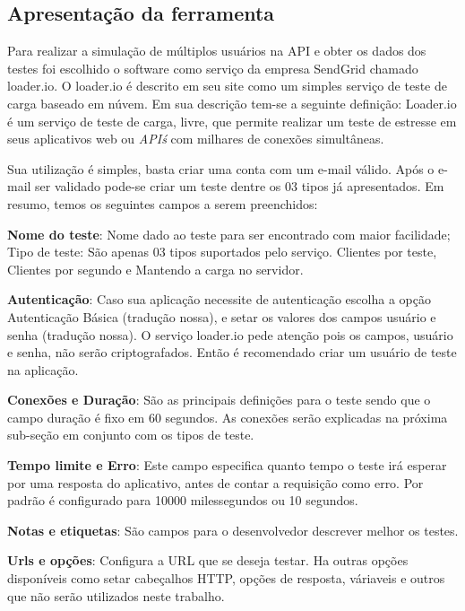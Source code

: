 \subsection{Apresentação da ferramenta}
  
  Para realizar a simulação de múltiplos usuários na \ac{API} e obter os dados dos testes foi 
  escolhido o software como serviço da empresa SendGrid chamado loader.io. O loader.io é descrito em seu site
  como um simples serviço de teste de carga baseado em núvem. Em sua descrição tem-se a seguinte
  definição: Loader.io é um serviço de teste de carga, livre, que permite realizar um teste de estresse em 
  seus aplicativos web ou \textit{API\'s} com milhares de conexões simultâneas.
  
  Sua utilização é simples, basta criar uma conta com um e-mail válido. Após o e-mail ser validado pode-se 
  criar um teste dentre os 03 tipos já apresentados. Em resumo, temos os seguintes campos a serem preenchidos:
  
  \textbf{Nome do teste}: Nome dado ao teste para ser encontrado com maior facilidade;
  Tipo de teste: São apenas 03 tipos suportados pelo serviço. Clientes por teste, Clientes por segundo e Mantendo 
  a carga no servidor.
  
  \textbf{Autenticação}: Caso sua aplicação necessite de autenticação escolha a opção Autenticação Básica (tradução nossa),
  e setar os valores dos campos usuário e senha (tradução nossa). O serviço loader.io pede atenção 
  pois os campos, usuário e senha, não serão criptografados. Então é recomendado criar um usuário de teste na aplicação.
  
  \textbf{Conexões e Duração}: São as principais definições para o teste sendo que o campo duração
  é fixo em 60 segundos. As conexões serão explicadas na próxima sub-seção em conjunto com os tipos de teste.
  
  \textbf{Tempo limite e Erro}: Este campo especifica quanto tempo o teste irá esperar por uma resposta do aplicativo, antes
  de contar a requisição como erro. Por padrão é configurado para 10000 milessegundos ou 10 segundos.
  
  \textbf{Notas e etiquetas}: São campos para o desenvolvedor descrever  melhor os testes.
  
  \textbf{Urls e opções}: Configura a \ac{URL} que se deseja testar. Ha outras opções disponíveis como setar cabeçalhos \ac{HTTP},
  opções de resposta, váriaveis e outros que não serão utilizados neste trabalho.
  
